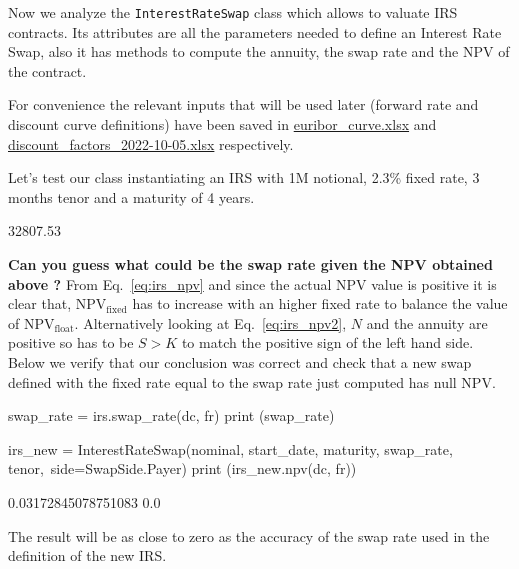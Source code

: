 \begin{finmarkets}
Now we analyze the \texttt{InterestRateSwap} class which allows to valuate IRS contracts. Its attributes are all the parameters needed to define an Interest Rate Swap, also it has methods to compute the annuity, the swap rate and the NPV of the contract. 
\end{finmarkets}


For convenience the relevant inputs that will be used later (forward rate and discount curve definitions) have been saved in \href{https://github.com/matteosan1/finance_course/raw/master/input_files/euribor_curve.xlsx}{euribor\_curve.xlsx} and \href{https://github.com/matteosan1/finance_course/raw/master/input_files/discount_factors_2022-10-05.xlsx}{discount\_factors\_2022-10-05.xlsx} respectively.

Let's test our class instantiating an IRS with 1M notional, 2.3\% fixed rate, 3 months tenor and a maturity of 4 years.


\begin{ioutput}
32807.53
\end{ioutput}
\textbf{Can you guess what could be the \textbf{swap rate} given the NPV obtained above ?}
\noindent
From Eq.~\ref{eq:irs_npv} and since the actual NPV value is positive it is clear that, NPV$_{\textrm{fixed}}$ has to increase with an higher fixed rate to balance the value of NPV$_{\textrm{float}}$.
Alternatively looking at Eq.~\ref{eq:irs_npv2}, $N$ and the annuity are positive so has to be $S > K$ to match the positive sign of the left hand side.  
Below we verify that our conclusion was correct and check that a new swap defined with the fixed rate equal to the swap rate just computed has null NPV.

\begin{ipythonnon}
swap_rate = irs.swap_rate(dc, fr)
print (swap_rate)

irs_new = InterestRateSwap(nominal, start_date, maturity, swap_rate, tenor,\
                           side=SwapSide.Payer)
print (irs_new.npv(dc, fr))
\end{ipythonnon}
\begin{ioutput}
0.03172845078751083
0.0
\end{ioutput}
\noindent
The result will be as close to zero as the accuracy of the swap rate used in the definition of the new IRS.
   

